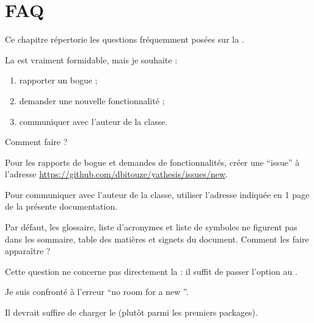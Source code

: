 \chapter{FAQ}\label{cha:faq}

Ce chapitre répertorie les questions fréquemment posées sur la \yatcl{}.

\begin{question}
  La \yatcl{} est vraiment formidable, mais je souhaite :
  \begin{enumerate}
  \item rapporter un bogue ;
  \item demander une nouvelle fonctionnalité ;
  \item communiquer avec l'auteur de la classe.
  \end{enumerate}
  Comment faire ?
\end{question}
\begin{solution}
  Pour les rapports de bogue et demandes de fonctionnalités, créer une
  \enquote{issue} à l'adresse
  \url{https://github.com/dbitouze/yathesis/issues/new}.

  Pour communiquer avec l'auteur de la classe, utiliser l'adresse indiquée en
  1\iere{} page de la présente documentation.
\end{solution}

\begin{question}
  Par défaut, les glossaire, liste d'acronymes et liste de symboles ne figurent
  pas dans les sommaire, table des matières et signets du document. Comment les
  faire apparaître ?
\end{question}
\begin{solution}
  Cette question ne concerne pas directement la \yatcl{} : il suffit de passer
  l'option  au .
\end{solution}

\begin{question}
  Je suis confronté à l'erreur \enquote{no room for a new }.
\end{question}
\begin{solution}
  Il devrait suffire de charger le  (plutôt parmi les
  premiers packages).
\end{solution}

%
\iffalse
\fi
